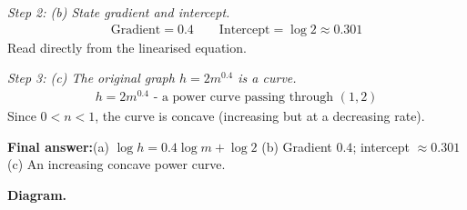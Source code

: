 \documentclass[11pt]{article}
\begin{document}
\textit{Step 2: (b) State gradient and intercept.}
\[\begin{gathered}
\text{Gradient} = 0.4 \qquad \text{Intercept} = \log 2 \approx 0.301
\end{gathered}\]
Read directly from the linearised equation.

\textit{Step 3: (c) The original graph \( h = 2m^{0.4} \) is a curve.}
\[\begin{gathered}
h = 2m^{0.4} \text{ - a power curve passing through } (1, 2)
\end{gathered}\]
Since \( 0 < n < 1 \), the curve is concave (increasing but at a decreasing rate).

\begin{answerbox}
\textbf{Final answer:}\quad (a) \(\displaystyle  \log h = 0.4\log m + \log 2 \) \quad  (b) Gradient \(\displaystyle  0.4 \); intercept \(\displaystyle  \approx 0.301 \) \quad  (c) An increasing concave power curve.
\end{answerbox}
\textbf{Diagram.}
\end{document}
